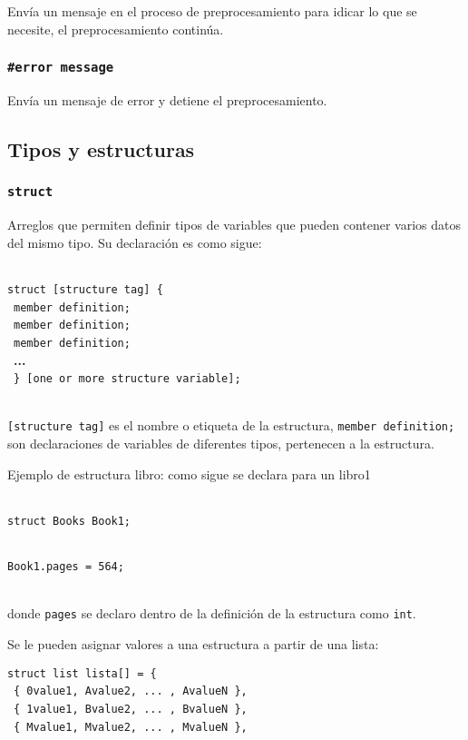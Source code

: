 Envía un mensaje en el proceso de preprocesamiento para idicar lo que se necesite, el preprocesamiento continúa.

\subsubsection{\texttt{\#error message}}

Envía un mensaje de error y detiene el preprocesamiento.

\subsection*{Tipos y estructuras}

\subsubsection{\texttt{struct}}

Arreglos que permiten definir tipos de variables que pueden contener varios datos del mismo tipo. Su declaración es como sigue: \\\

\texttt{struct [structure tag] \{ } \\\
\texttt{member definition;}\\\
\texttt{member definition;}\\\
\texttt{member definition;}\\\
\textbf{...}\\\
\texttt{\} [one or more structure variable]; }\\\

\texttt{[structure tag]} es el nombre o etiqueta de la estructura, \texttt{member definition;} son declaraciones de variables de diferentes tipos, pertenecen a la estructura. 

Ejemplo de estructura libro: como sigue se declara para un libro1\\\

\texttt{struct Books Book1;}\\\


\texttt{Book1.pages = 564;}\\\

donde \texttt{pages} se declaro dentro de la definición de la estructura como \texttt{int}.

Se le pueden asignar valores a una estructura a partir de una lista:

\texttt{struct list lista[] = \{ }\\\
\texttt{\{ 0value1, Avalue2, ... , AvalueN \},} \\\
\texttt{\{ 1value1, Bvalue2, ... , BvalueN \},} \\\
\texttt{\{ Mvalue1, Mvalue2, ... , MvalueN \},} \\\

